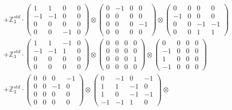 \documentclass{article}
\begin{document}
{\begin{align}
        &+ \label{Rs16-Rc11-Solution-29-c22} \mathbb{Z}_3^{std} \cdot 
            \begin{pmatrix} 1 & 1 & 0 & 0 \\ -1 & -1 & 0 & 0 \\ 0 & 0 & 0 & 0 \\ 0 & 0 & -1 & 0 \end{pmatrix} \otimes 
            \begin{pmatrix} 0 & -1 & 0 & 0 \\ 0 & 0 & 0 & 0 \\ 0 & 0 & 0 & -1 \\ 0 & 0 & 0 & 0 \end{pmatrix} \otimes 
            \begin{pmatrix} 0 & 0 & 0 & 0 \\ -1 & 0 & 0 & 0 \\ 0 & 0 & -1 & -1 \\ 0 & 0 & 1 & 1 \end{pmatrix} \\ 
        &+ \label{Rs16-Rc11-Solution-29-c23} \mathbb{Z}_3^{std} \cdot 
            \begin{pmatrix} 1 & 1 & -1 & 0 \\ -1 & -1 & 1 & 0 \\ 0 & 0 & 0 & 0 \\ 0 & 0 & 0 & 0 \end{pmatrix} \otimes 
            \begin{pmatrix} 0 & 0 & 0 & 0 \\ 0 & 0 & 0 & 0 \\ 0 & 0 & 0 & 1 \\ 0 & 0 & 0 & 0 \end{pmatrix} \otimes 
            \begin{pmatrix} 0 & 0 & 0 & 0 \\ -1 & 0 & 0 & 0 \\ 1 & 0 & 0 & 0 \\ -1 & 0 & 0 & 0 \end{pmatrix} \\ 
        &+ \label{Rs16-Rc11-Solution-29-c24} \mathbb{Z}_3^{std} \cdot 
            \begin{pmatrix} 0 & 0 & 0 & -1 \\ 0 & 0 & -1 & 0 \\ 0 & 0 & 0 & 0 \\ 0 & 0 & 0 & 0 \end{pmatrix} \otimes 
            \begin{pmatrix} 0 & -1 & 0 & -1 \\ 1 & 1 & -1 & 0 \\ 1 & 0 & -1 & -1 \\ -1 & -1 & 1 & 0 \end{pmatrix} \otimes 

\end{align}}
\end{document}
